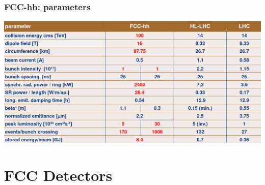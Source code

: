 \documentclass[aspectratio=169]{beamer}
\begin{document}
\begin{frame}
  \frametitle{FCC-hh: parameters}
     \includegraphics[width=1.0\linewidth]{figures/parameters-fcchh.png}\\
\end{frame}


%
%
\section{FCC Detectors}
\end{document}
